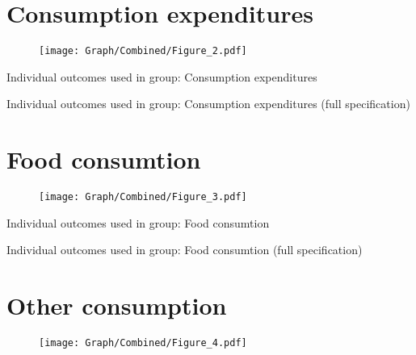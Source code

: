 \documentclass[10pt,a4paper]{article}
\begin{document}
\section{Consumption expenditures}
\begin{table}[H]\centering

\end{table}
\begin{figure}[H]\centering
\texttt{[image: Graph/Combined/Figure\_2.pdf]}
\caption{} \label{fig:Fig_2}
\end{figure}

\begin{table}[H]\centering\caption{Individual outcomes used in group: Consumption expenditures }
\resizebox{\textwidth}{!}{}
\end{table}
\begin{table}[H]\centering\caption{Individual outcomes used in group: Consumption expenditures (full specification)}
\resizebox{\textwidth}{!}{}
\end{table}
\pagebreak
\section{Food consumtion}
\begin{table}[H]\centering

\end{table}
\begin{figure}[H]\centering
\texttt{[image: Graph/Combined/Figure\_3.pdf]}
\caption{} \label{fig:Fig_3}
\end{figure}

\begin{table}[H]\centering\caption{Individual outcomes used in group: Food consumtion }
\resizebox{\textwidth}{!}{}
\end{table}
\begin{table}[H]\centering\caption{Individual outcomes used in group: Food consumtion (full specification)}
\resizebox{\textwidth}{!}{}
\end{table}
\pagebreak
\section{Other consumption}
\begin{table}[H]\centering

\end{table}
\begin{figure}[H]\centering
\texttt{[image: Graph/Combined/Figure\_4.pdf]}
\caption{} \label{fig:Fig_4}
\end{figure}
\end{document}
